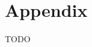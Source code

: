 \chapter*{Appendix}
    \ifpdf
        \graphicspath{{X/figures/PNG/}{X/figures/PDF/}{X/figures/}}
    \else
        \graphicspath{{X/figures/EPS/}{X/figures/}}
    \fi

    TODO
